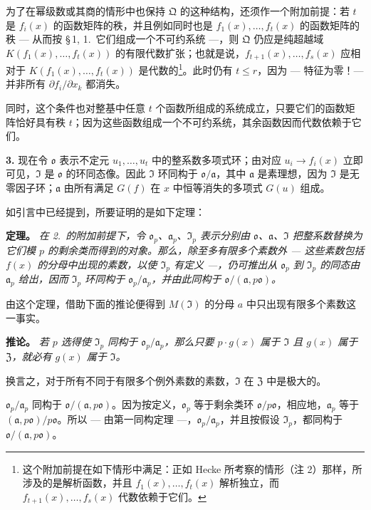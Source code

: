 为了在幂级数或其商的情形中也保持 $\mathfrak{Q}$ 的这种结构，还须作一个附加前提：若 $t$ 是 $f_i(x)$ 的函数矩阵的秩，并且例如同时也是 $f_1(x),\ldots,f_t(x)$ 的函数矩阵的秩 --- 从而按 \S\,1, 1.\ 它们组成一个不可约系统 ---，则 $\mathfrak{Q}$ 仍应是纯超越域 $K(f_1(x),\ldots,f_t(x))$ 的有限代数扩张；也就是说，$f_{t+1}(x),\ldots,f_s(x)$ 应相对于 $K(f_1(x),\ldots,f_t(x))$ 是代数的\footnote{这个附加前提在如下情形中满足：正如 Hecke 所考察的情形（注 2）那样，所涉及的是解析函数，并且 $f_1(x),\ldots,f_t(x)$ 解析独立，而 $f_{t+1}(x),\ldots,f_s(x)$ 代数依赖于它们。}。此时仍有 $t \leq r$，因为 --- 特征为零！--- 并非所有 $\partial f_i/\partial x_k$ 都消失。

同时，这个条件也对整基中任意 $t$ 个函数所组成的系统成立，只要它们的函数矩阵恰好具有秩 $t$；因为这些函数组成一个不可约系统，其余函数因而代数依赖于它们。

\medskip\noindent\textbf{3.}
现在令 $\mathfrak{o}$ 表示不定元 $u_1,\ldots,u_t$ 中的整系数多项式环；由对应 $u_i \to f_i(x)$ 立即可见，$\mathfrak{I}$ 是 $\mathfrak{o}$ 的环同态像。因此 $\mathfrak{I}$ 环同构于 $\mathfrak{o}/\mathfrak{a}$，其中 $\mathfrak{a}$ 是素理想，因为 $\mathfrak{I}$ 是无零因子环；$\mathfrak{a}$ 由所有满足 $G(f)$ 在 $x$ 中恒等消失的多项式 $G(u)$ 组成。

如引言中已经提到，所要证明的是如下定理：

\medskip\noindent\textbf{定理。}
\textit{在 2.\ 的附加前提下，令 $\mathfrak{o}_p$、$\mathfrak{a}_p$、$\mathfrak{I}_p$ 表示分别由 $\mathfrak{o}$、$\mathfrak{a}$、$\mathfrak{I}$ 把整系数替换为它们模 $p$ 的剩余类而得到的对象。那么，除至多有限多个素数外 --- 这些素数包括 $f(x)$ 的分母中出现的素数，以使 $\mathfrak{I}_p$ 有定义 ---，仍可推出从 $\mathfrak{o}_p$ 到 $\mathfrak{I}_p$ 的同态由 $\mathfrak{a}_p$ 给出，因而 $\mathfrak{I}_p$ 环同构于 $\mathfrak{o}_p/\mathfrak{a}_p$，并由此同构于 $\mathfrak{o}/(\mathfrak{a}, p\mathfrak{o})$。}

由这个定理，借助下面的推论便得到 $M(\mathfrak{I})$ 的分母 $a$ 中只出现有限多个素数这一事实。

\medskip\noindent\textbf{推论。}
\textit{若 $p$ 选得使 $\mathfrak{I}_p$ 同构于 $\mathfrak{o}_p/\mathfrak{a}_p$，那么只要 $p \cdot g(x)$ 属于 $\mathfrak{I}$ 且 $g(x)$ 属于 $\mathfrak{Z}$，就必有 $g(x)$ 属于 $\mathfrak{I}$。}

换言之，对于所有不同于有限多个例外素数的素数，$\mathfrak{I}$ 在 $\mathfrak{Z}$ 中是极大的。

$\mathfrak{o}_p/\mathfrak{a}_p$ 同构于 $\mathfrak{o}/(\mathfrak{a}, p\mathfrak{o})$。因为按定义，$\mathfrak{o}_p$ 等于剩余类环 $\mathfrak{o}/p\mathfrak{o}$，相应地，$\mathfrak{a}_p$ 等于 $(\mathfrak{a}, p\mathfrak{o})/p\mathfrak{o}$。所以 --- 由第一同构定理 ---，$\mathfrak{o}_p/\mathfrak{a}_p$，并且按假设 $\mathfrak{I}_p$，都同构于 $\mathfrak{o}/(\mathfrak{a}, p\mathfrak{o})$。

